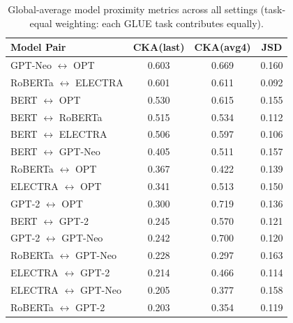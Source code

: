 \begin{table}[!ht]
\centering
\footnotesize
\setlength{\tabcolsep}{3pt}
\begin{tabular}{lccc}
\toprule
\textbf{Model Pair} & \textbf{CKA(last)} & \textbf{CKA(avg4)} & \textbf{JSD} \\
\midrule
GPT-Neo $\leftrightarrow$ OPT & 0.603 & 0.669 & 0.160 \\
RoBERTa $\leftrightarrow$ ELECTRA & 0.601 & 0.611 & 0.092 \\
BERT $\leftrightarrow$ OPT & 0.530 & 0.615 & 0.155 \\
BERT $\leftrightarrow$ RoBERTa & 0.515 & 0.534 & 0.112 \\
BERT $\leftrightarrow$ ELECTRA & 0.506 & 0.597 & 0.106 \\
BERT $\leftrightarrow$ GPT-Neo & 0.405 & 0.511 & 0.157 \\
RoBERTa $\leftrightarrow$ OPT & 0.367 & 0.422 & 0.139 \\
ELECTRA $\leftrightarrow$ OPT & 0.341 & 0.513 & 0.150 \\
GPT-2 $\leftrightarrow$ OPT & 0.300 & 0.719 & 0.136 \\
BERT $\leftrightarrow$ GPT-2 & 0.245 & 0.570 & 0.121 \\
GPT-2 $\leftrightarrow$ GPT-Neo & 0.242 & 0.700 & 0.120 \\
RoBERTa $\leftrightarrow$ GPT-Neo & 0.228 & 0.297 & 0.163 \\
ELECTRA $\leftrightarrow$ GPT-2 & 0.214 & 0.466 & 0.114 \\
ELECTRA $\leftrightarrow$ GPT-Neo & 0.205 & 0.377 & 0.158 \\
RoBERTa $\leftrightarrow$ GPT-2 & 0.203 & 0.354 & 0.119 \\
\bottomrule
\end{tabular}
\caption{Global-average model proximity metrics across all settings (task-equal weighting: each GLUE task contributes equally).}
\label{tab:proximity}
\end{table}